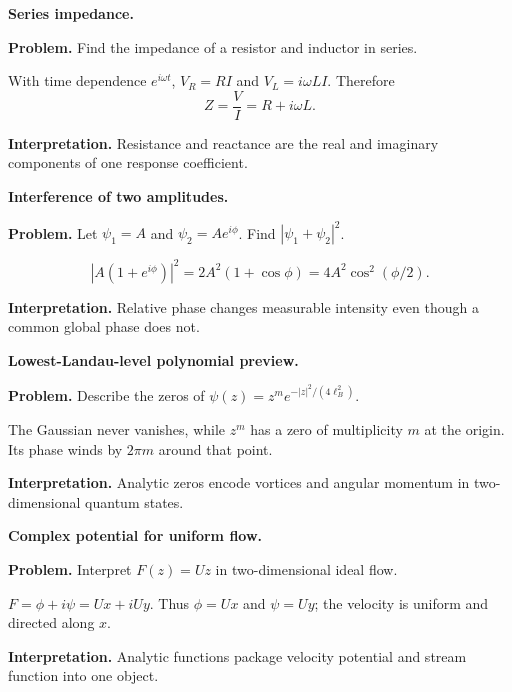 \begin{workedexample}
\textbf{Series impedance.}\par
\textbf{Problem.} Find the impedance of a resistor and inductor in series.
\begin{solution}
With time dependence $e^{i\omega t}$, $V_R=RI$ and $V_L=i\omega LI$. Therefore
\[
Z=\frac{V}{I}=R+i\omega L.
\]

\textbf{Interpretation.} Resistance and reactance are the real and imaginary components of one response coefficient.
\end{solution}
\end{workedexample}

\begin{workedexample}
\textbf{Interference of two amplitudes.}\par
\textbf{Problem.} Let $\psi_1=A$ and $\psi_2=Ae^{i\phi}$. Find $|\psi_1+\psi_2|^2$.
\begin{solution}
\[
|A(1+e^{i\phi})|^2=2A^2(1+\cos\phi)=4A^2\cos^2(\phi/2).
\]

\textbf{Interpretation.} Relative phase changes measurable intensity even though a common global phase does not.
\end{solution}
\end{workedexample}

\begin{workedexample}
\textbf{Lowest-Landau-level polynomial preview.}\par
\textbf{Problem.} Describe the zeros of $\psi(z)=z^m e^{-|z|^2/(4\ell_B^2)}$.
\begin{solution}
The Gaussian never vanishes, while $z^m$ has a zero of multiplicity $m$ at the origin. Its phase winds by $2\pi m$ around that point.

\textbf{Interpretation.} Analytic zeros encode vortices and angular momentum in two-dimensional quantum states.
\end{solution}
\end{workedexample}

\begin{workedexample}
\textbf{Complex potential for uniform flow.}\par
\textbf{Problem.} Interpret $F(z)=Uz$ in two-dimensional ideal flow.
\begin{solution}
$F=\phi+i\psi=U x+iUy$. Thus $\phi=Ux$ and $\psi=Uy$; the velocity is uniform and directed along $x$.

\textbf{Interpretation.} Analytic functions package velocity potential and stream function into one object.
\end{solution}
\end{workedexample}
